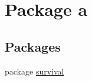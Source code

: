 \hypertarget{namespacea}{}\section{Package a}
\label{namespacea}
\subsection*{Packages}
\begin{DoxyCompactItemize}
\item 
package \hyperlink{namespacea_1_1survival}{survival}
\end{DoxyCompactItemize}
